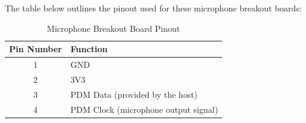 The table below outlines the pinout used for these microphone breakout boards:
\begin{table}[h]
	\centering
	\begin{tabular}{|c|l|}
		\hline
		\textbf{Pin Number} & \textbf{Function}                    \\
		\hline
		1                   & GND                                  \\
		\hline
		2                   & 3V3                                  \\
		\hline
		3                   & PDM Data (provided by the host)      \\
		\hline
		4                   & PDM Clock (microphone output signal) \\
		\hline
	\end{tabular}
	\caption{Microphone Breakout Board Pinout}
	\label{tab:mic_breakout_pinout}
\end{table}

\newpage
